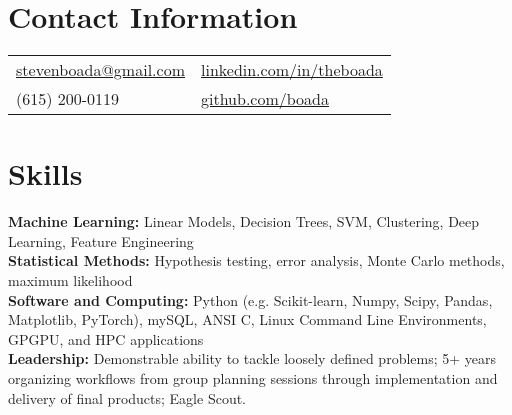 \documentclass[margin,line, 11pt]{res}
\begin{document}

\begin{resume}
\vspace*{-2mm}
\section{Contact Information}
\begin{tabular}{@{}p{4.45in}p{4in}}
\href{mailto:stevenboada@gmail.com}{stevenboada@gmail.com} & \href{https://linkedin.com/in/theboada}{linkedin.com/in/theboada} \\
(615) 200-0119 & \href{https://github.com/boada}{github.com/boada} \\
\end{tabular}
\vspace*{-4mm}


\section{Skills}
\textbf{Machine Learning:} Linear Models, Decision Trees, SVM, Clustering, Deep Learning, Feature Engineering\\
\textbf{Statistical Methods:} Hypothesis testing, error analysis, Monte Carlo methods, maximum likelihood\\
\textbf{Software and Computing:}  Python (e.g. Scikit-learn, Numpy, Scipy, Pandas, Matplotlib, PyTorch), mySQL, ANSI C, Linux Command Line Environments, GPGPU, and HPC applications\\
\textbf{Leadership:} Demonstrable ability to tackle loosely defined problems; 5+ years organizing workflows from group planning sessions through implementation and delivery of final products; Eagle Scout. \\
\vspace*{-7mm}


\end{resume}
\end{document}
